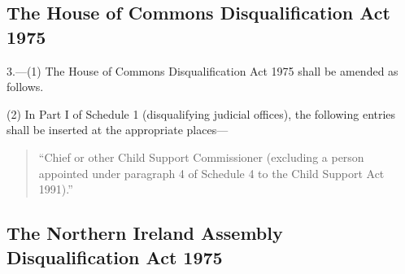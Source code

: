\documentclass[a4paper]{article}
\begin{document}
%


\subsection*{The House of Commons Disqualification Act 1975}

3.---(1) The House of Commons Disqualification Act 1975 shall be amended as follows.

(2) In Part I of Schedule 1 (disqualifying judicial offices), the following entries shall be inserted at the appropriate places— 
\begin{quotation}
“Chief or other Child Support Commissioner (excluding a person appointed under paragraph 4 of Schedule 4 to the Child Support Act 1991).''
\end{quotation}



\subsection*{The Northern Ireland Assembly Disqualification Act 1975}
\end{document}
